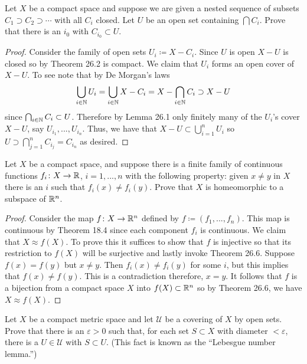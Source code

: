 \begin{problem}
Let $X$ be a compact space and suppose we are given a nested
sequence of subsets $C_1\supset C_2\supset\cdots$ with all $C_i$
closed. Let $U$ be an open set containing $\bigcap C_i$. Prove
that there is an $i_0$ with $C_{i_0}\subset U$.
\end{problem}
\begin{proof}
Consider the family of open sets $U_i\coloneqq X-C_i$. Since $U$
is open $X-U$ is closed so by Theorem 26.2 is compact. We claim
that $U_i$ forms an open cover of $X-U$. To see note that by De
Morgan's laws
\[
\bigcup_{i\in\mathbb{N}} U_i=\bigcup_{i\in\mathbb{N}} X-C_i=X-\bigcap_{i\in\mathbb{N}}
C_i\supset X-U
\]
since $\bigcap_{i\in\mathbb{N}} C_i\subset U$. Therefore by Lemma 26.1
only finitely many of the $U_i$'s cover $X-U$, say
$U_{i_1},...,U_{i_n}$. Thus, we have that $X-U\subset \bigcup_{i=1}^n
U_i$ so $U\supset\bigcap_{j=1}^n C_{i_j}=C_{i_n}$ as desired.
\end{proof}
\begin{problem}
Let $X$ be a compact space, and suppose there is a finite family
of continuous functions $f_i\colon X\to\mathbb{R}$, $i=1,...,n$ with the
following property: given $x\neq y$ in $X$ there is an $i$ such
that $f_i(x)\neq f_i(y)$. Prove that $X$ is homeomorphic to a
subspace of $\mathbb{R}^n$.
\end{problem}
\begin{proof}
Consider the map $f\colon X\to\mathbb{R}^n$ defined by
$f\coloneqq(f_1,...,f_n)$. This map is continuous by Theorem 18.4
since each component $f_i$ is continuous. We claim that $X\approx
f(X)$. To prove this it suffices to show that $f$ is injective so
that its restriction to $f(X)$ will be surjective and lastly
invoke Theorem 26.6. Suppose $f(x)=f(y)$ but $x\neq y$. Then
$f_i(x)\neq f_i(y)$ for some $i$, but this implies that $f(x)\neq
f(y)$. This is a contradiction therefore, $x=y$. It follows that
$f$ is a bijection from a compact space $X$ into
$f(X)\subset\mathbb{R}^n$ so by Theorem 26.6, we have $X\approx f(X)$.
\end{proof}
\begin{problem}
Let $X$ be a compact metric space and let $\mathcal{U}$ be a
covering of $X$ by open sets. Prove that there is an
$\varepsilon>0$ such that, for each set $S\subset X$ with
diameter $<\varepsilon$, there is a $U\in\mathcal{U}$ with
$S\subset U$. (This fact is known as the ``Lebesgue number lemma.'')
\end{problem}
